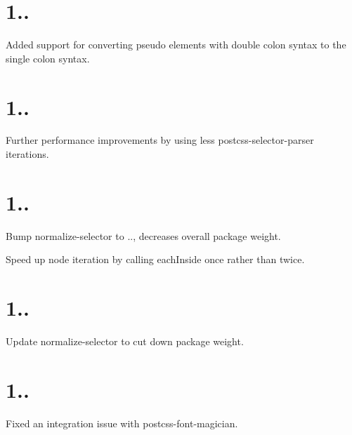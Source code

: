 \section*{1..}


\begin{DoxyItemize}
\item Added support for converting pseudo elements with double colon syntax to the single colon syntax.
\end{DoxyItemize}

\section*{1..}


\begin{DoxyItemize}
\item Further performance improvements by using less postcss-\/selector-\/parser iterations.
\end{DoxyItemize}

\section*{1..}


\begin{DoxyItemize}
\item Bump normalize-\/selector to {..}, decreases overall package weight.
\item Speed up node iteration by calling {\ttfamily each\+Inside} once rather than twice.
\end{DoxyItemize}

\section*{1..}


\begin{DoxyItemize}
\item Update normalize-\/selector to cut down package weight.
\end{DoxyItemize}

\section*{1..}


\begin{DoxyItemize}
\item Fixed an integration issue with postcss-\/font-\/magician.
\end{DoxyItemize}

